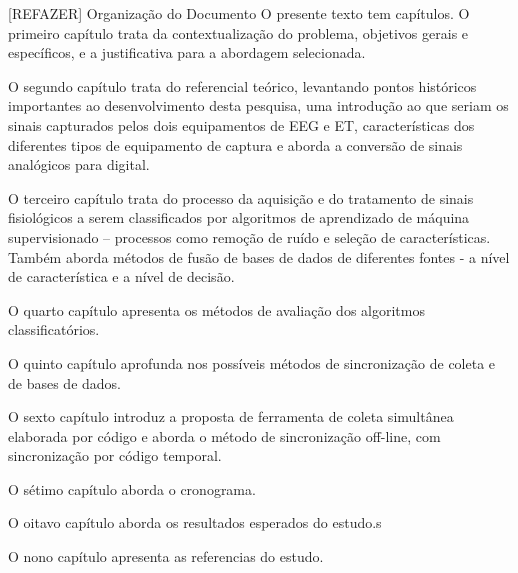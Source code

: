 \documentclass[a4paper, 12pt]{ppgeb}
\makeatletter
\renewcommand{\section}{\@startsection
{section}
{1}
{0mm}
{-\baselineskip}
{0.5\baselineskip}
{\large\bfseries\scshape}}
\makeatother
\begin{document}
\section{[REFAZER] Organização do Documento}
O presente texto tem  capítulos. O primeiro capítulo trata da contextualização do problema, objetivos gerais e específicos, e a justificativa para a abordagem selecionada. 

O segundo capítulo trata do referencial teórico, levantando pontos históricos importantes ao desenvolvimento desta pesquisa, uma introdução ao que seriam os sinais capturados pelos dois equipamentos de EEG e ET, características dos diferentes tipos de equipamento de captura e aborda a conversão de sinais analógicos para digital. 

O terceiro capítulo trata do processo da aquisição e do tratamento de sinais fisiológicos a serem classificados por algoritmos de aprendizado de máquina supervisionado – processos como remoção de ruído e seleção de características. Também aborda métodos de fusão de bases de dados de diferentes fontes - a nível de característica e a nível de decisão. 

O quarto capítulo apresenta os métodos de avaliação dos algoritmos classificatórios. 

O quinto capítulo aprofunda nos possíveis métodos de sincronização de coleta e de bases de dados.

O sexto capítulo introduz a proposta de ferramenta de coleta simultânea elaborada por código e aborda o método de sincronização off-line, com sincronização por código temporal. 

O sétimo capítulo aborda o cronograma.

O oitavo capítulo aborda os resultados esperados do estudo.s


O nono capítulo apresenta as referencias do estudo.





%



%




\end{document}
